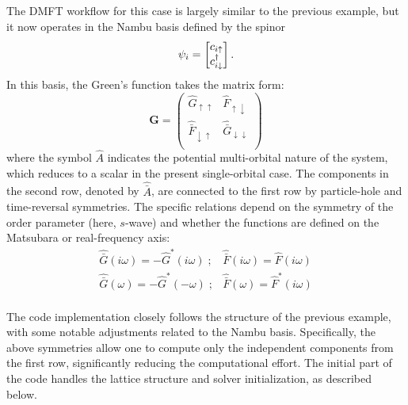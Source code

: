 \documentclass[edipack2.tex]{subfiles}
\begin{document}
The DMFT workflow for this case is largely similar to the previous 
example, but it now operates in the Nambu basis defined by the spinor
$$
\psi_i=\begin{bmatrix} c_{i\uparrow} \\ c^\dagger_{i\downarrow} \end{bmatrix}. 
$$
In this basis, the Green's function takes the matrix form:
\begin{equation}
  {\mathbf G} =
  \begin{pmatrix}
    \hat{G}_{\uparrow\uparrow} & \hat{F}_{\uparrow\downarrow}\\
    \hat{\bar{F}}_{\downarrow\uparrow}  &    \hat{\bar{G}}_{\downarrow\downarrow} \\
  \end{pmatrix}
\end{equation}
where the symbol $\hat{A}$ indicates the potential multi-orbital 
nature of the system, which reduces to a scalar in the present 
single-orbital case. The components in the second row, denoted 
by $\hat{\bar{A}}$, are connected to the first row by particle-hole 
and time-reversal symmetries. The specific relations depend on the 
symmetry of the order parameter (here, $s$-wave) and whether the 
functions are defined on the Matsubara or real-frequency axis:
\begin{equation}
\begin{array}{cc}
  \hat{\bar{G}}(i\omega) = -\hat{G}^*(i\omega)\;; &  \hat{\bar{F}}(i\omega) = \hat{F}(i\omega)\\
  \hat{\bar{G}}(\omega)  = -\hat{G}^*(-\omega) \;; & \hat{\bar{F}}(\omega) = \hat{F}^*(i\omega)\\
\end{array}
\end{equation}  

The code implementation closely follows the structure of the previous 
example, with some notable adjustments related to the Nambu basis. 
Specifically, the above symmetries allow one to compute only the 
independent components from the first row, significantly reducing 
the computational effort. The initial part of the code handles the 
lattice structure and solver initialization, as described below.
\end{document}

